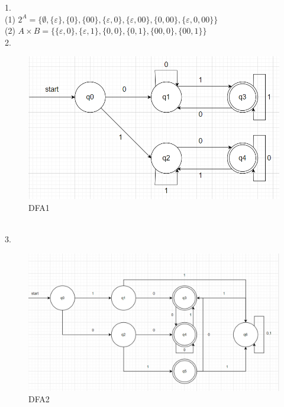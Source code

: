 \documentclass{article}
\begin{document}
1. \\
(1) $2^{A} = \{\emptyset, \{\varepsilon\}, \{0\}, \{00\}, \{\varepsilon, 0\}, \{\varepsilon, 00\},\{0, 00\}, \{\varepsilon, 0, 00\}\}$ \\
(2) $A \times B = \{\{\varepsilon, 0\}, \{\varepsilon, 1\}, \{0, 0\}, \{0, 1\}, \{00, 0\}, \{00, 1\}\}$ \\
2.\\
\begin{figure}[htbp]
	\centering
    \includegraphics[width=1\columnwidth,height=!]{DFA1.png}
	\caption{DFA1}
\end{figure}
\\
3.\\
\begin{figure}[htbp]
	\centering
    \includegraphics[width=1\columnwidth,height=!]{DFA2.png}
	\caption{DFA2}
\end{figure}
\end{document}

